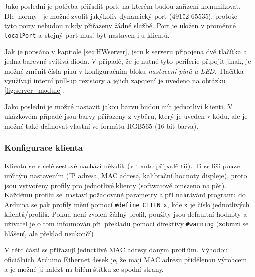 Jako poslední je potřeba přiřadit port, na kterém budou zařízení komunikovat. Dle~normy~\cite{norm_RFC6335} je možné zvolit jakýkoliv dynamický port (49152-65535), protože tyto porty nebudou nikdy přiřazeny žádné službě. Port je uložen v proměnné \texttt{localPort} a~stejný port musí být nastaven i u klientů.


\clearpage
Jak je popsáno v kapitole \ref{sec:HWserver}, jsou k serveru připojena dvě tlačítka a jedna barevná svítivá dioda. V případě, že je nutné tyto periferie připojit jinak, je možné změnit čísla pinů v konfiguračním bloku \textit{nastavení pinů a LED}. Tlačítka využívají interní pull-up rezistory a jejich zapojení je uvedeno na obrázku \ref{fig:server_module}.


Jako poslední je možné nastavit jakou barvu budou mít jednotliví klienti. V ukázkovém případě jsou barvy přiřazeny z výběru, který je uveden v kódu, ale je možné také definovat vlastní ve formátu RGB565 (16-bit barva).


\subsubsection{Konfigurace klienta}
\label{sec:client-nastaveni}
Klientů se v celé sestavě nachází několik (v tomto případě tři). Ti se liší pouze určitým nastavením (IP adresa, MAC adresa, kalibrační hodnoty displeje), proto jsou vytvořeny profily pro jednotlivé klienty (softwarově omezeno na pět). Každému profilu se~nastaví požadované parametry a při nahrávání programu do Arduina se pak profily mění pomocí \texttt{\#define CLIENTx}, kde x je číslo jednotlivých klientů/profilů. Pokud není zvolen žádný profil, použity jsou defaultní hodnoty a uživatel je o tom informován při~překladu pomocí direktivy \texttt{\#warning} (zobrazí se hlášení, ale překlad neukončí).


V této části se přiřazují jednotlivé MAC adresy daným profilům. Výhodou oficiálních Arduino Ethernet desek je, že mají MAC adresu přidělenou výrobcem a je možné ji nalézt na bílém štítku ze spodní strany.


